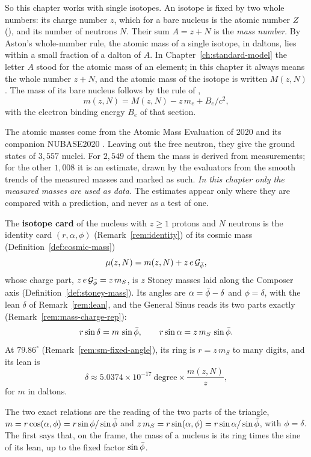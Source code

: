 So this chapter works with single isotopes. An isotope is fixed by two whole numbers: its charge number $z$, which for a bare nucleus is the atomic number $Z$ (), and its number of neutrons $N$. Their sum $A = z + N$ is the \emph{mass number}. By Aston's whole-number rule, the atomic mass of a single isotope, in daltons, lies within a small fraction of a dalton of $A$. In Chapter~\ref{ch:standard-model} the letter $A$ stood for the atomic mass of an element; in this chapter it always means the whole number $z + N$, and the atomic mass of the isotope is written $M(z, N)$. The mass of its bare nucleus follows by the rule of ,
\[
m(z, N) = M(z, N) - z\,m_e + B_e/c^2 ,
\]
with the electron binding energy $B_e$ of that section.

The atomic masses come from the Atomic Mass Evaluation of 2020 and its companion NUBASE2020 \citep{Wang2021,Kondev2021}. Leaving out the free neutron, they give the ground states of $3{,}557$ nuclei. For $2{,}549$ of them the mass is derived from measurements; for the other $1{,}008$ it is an estimate, drawn by the evaluators from the smooth trends of the measured masses and marked as such. \emph{In this chapter only the measured masses are used as data.} The estimates appear only where they are compared with a prediction, and never as a test of one.

\begin{definition}\label{def:isotope-card}
The \textbf{isotope card} of the nucleus with $z \ge 1$ protons and $N$ neutrons is the identity card $(r, \alpha, \phi)$ (Remark~\ref{rem:identity}) of its cosmic mass (Definition~\ref{def:cosmic-mass})
\[
\mu(z, N) = m(z, N) + z\,e\,\mathcal{G}_{\bar{\phi}} ,
\]
whose charge part, $z\,e\,\mathcal{G}_{\bar{\phi}} = z\,m_S$, is $z$ Stoney masses laid along the Composer axis (Definition~\ref{def:stoney-mass}). Its angles are $\alpha = \bar{\phi} - \delta$ and $\phi = \delta$, with the lean $\delta$ of Remark~\ref{rem:lean}, and the General Sinus reads its two parts exactly (Remark~\ref{rem:mass-charge-rep}):
\[
r\sin\delta = m\,\sin\bar{\phi}, \qquad r\sin\alpha = z\,m_S\,\sin\bar{\phi} .
\]
At $79.86^\circ$ (Remark~\ref{rem:sm-fixed-angle}), its ring is $r = z\,m_S$ to many digits, and its lean is
\[
\delta \approx 5.0374 \times 10^{-17}\ \text{degree} \times \frac{m(z, N)}{z},
\]
for $m$ in daltons.
\end{definition}

The two exact relations are the reading of the two parts of the triangle, $m = r\cos(\alpha, \phi) = r\sin\phi/\sin\bar{\phi}$ and $z\,m_S = r\sin(\alpha, \phi) = r\sin\alpha/\sin\bar{\phi}$, with $\phi = \delta$. The first says that, on the frame, the mass of a nucleus is its ring times the sine of its lean, up to the fixed factor $\sin\bar{\phi}$.

